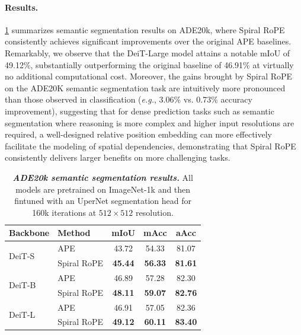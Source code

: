 \paragraph{Results.} \cref{tab:segmentation} summarizes semantic segmentation results on ADE20k, where Spiral RoPE consistently achieves significant improvements over the original APE baselines. Remarkably, we observe that the DeiT-Large model attains a notable mIoU of 49.12\%, substantially outperforming the original baseline of 46.91\% at virtually no additional computational cost. Moreover, the gains brought by Spiral RoPE on the ADE20K semantic segmentation task are intuitively more pronounced than those observed in classification (\emph{e.g.}, 3.06\% vs. 0.73\% accuracy improvement), suggesting that for dense prediction tasks such as semantic segmentation where reasoning is more complex and higher input resolutions are required, a well-designed relative position embedding can more effectively facilitate the modeling of spatial dependencies, demonstrating that Spiral RoPE consistently delivers larger benefits on more challenging tasks.

\begin{table}[t]
    \caption{\textbf{\textit{ADE20k semantic segmentation results.}} All models are pretrained on ImageNet-1k and then fintuned with an UperNet segmentation head for 160k iterations at $512 \times 512$ resolution.}
    \label{tab:segmentation}
    \begin{center}
        \begin{small}
            \begin{sc}
                \begin{tabular}{llccc}
                    \toprule
                    Backbone & Method & mIoU & mAcc & aAcc \\
                    \midrule
                    \multirow{2}{*}{DeiT-S} 
                    & APE & 43.72 & 54.33 & 81.07 \\
                    & Spiral RoPE & \textbf{45.44} & \textbf{56.33} & \textbf{81.61} \\
                    \midrule
                    \multirow{2}{*}{DeiT-B} 
                    & APE & 46.89 & 57.28 & 82.30 \\
                    & Spiral RoPE & \textbf{48.11} & \textbf{59.07} & \textbf{82.76} \\
                    \midrule
                    \multirow{2}{*}{DeiT-L} 
                    & APE & 46.91 & 57.05 & 82.36 \\
                    & Spiral RoPE & \textbf{49.12} & \textbf{60.11} & \textbf{83.40} \\
                    \bottomrule
                \end{tabular}
            \end{sc}
        \end{small}
    \end{center}
    \vskip -0.1in
\end{table}

